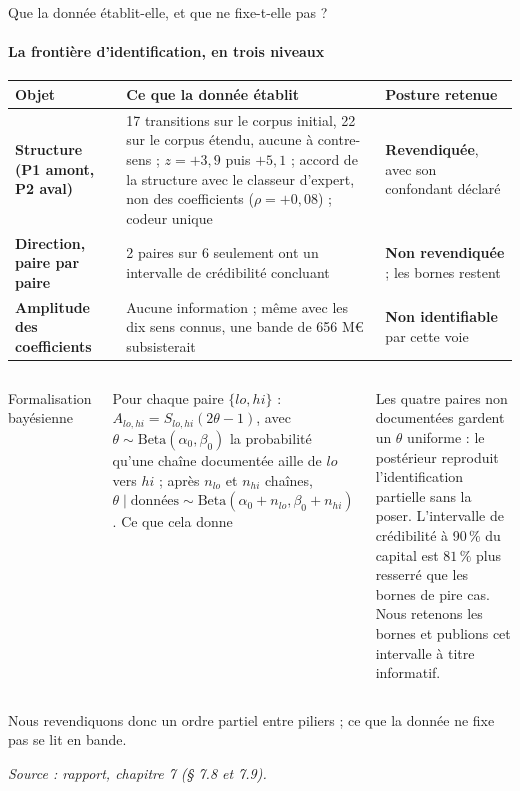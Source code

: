 \documentclass[aspectratio=169,10pt,t]{beamer}
\newcommand{\source}[1]{\par\vfill{\tiny\color{gris}\textit{Source : #1}}\par\vspace{-1mm}}
\renewcommand{\arraystretch}{1.25}
\begin{document}
\begin{frame}{Que la donnée établit-elle, et que ne fixe-t-elle pas ?}
  \suivimethode{}{}
  \framesubtitle{\ajout La frontière d'identification, en trois niveaux}
  \scriptsize
  \renewcommand{\arraystretch}{1.18}
  \begin{tabularx}{\linewidth}{@{}>{\bfseries}l Y Y@{}}
    \toprule
    Objet & Ce que la donnée établit & Posture retenue \\
    \midrule
    Structure (P1 amont, P2 aval) & 17 transitions sur le corpus initial, 22 sur le corpus étendu, aucune à contre-sens ; $z=+3{,}9$ puis $+5{,}1$ ; accord de la structure avec le classeur d'expert, non des coefficients ($\rho=+0{,}08$) ; codeur unique & \textbf{Revendiquée}, avec son confondant déclaré \\
    Direction, paire par paire & 2 paires sur 6 seulement ont un intervalle de crédibilité concluant & \textbf{Non revendiquée} ; les bornes restent \\
    Amplitude des coefficients & Aucune information ; même avec les dix sens connus, une bande de 656 M€ subsisterait & \textbf{Non identifiable} par cette voie \\
    \bottomrule
  \end{tabularx}
  \vspace{2mm}
  \begin{columns}[T,onlytextwidth]
    \footnotesize
    {\editorial\normalsize Formalisation bayésienne}\par\vspace{1mm}
    Pour chaque paire $\{lo,hi\}$ : $A_{lo,hi}=S_{lo,hi}(2\theta-1)$, avec $\theta\sim\mathrm{Beta}(\alpha_0,\beta_0)$ la probabilité qu'une chaîne documentée aille de $lo$ vers $hi$ ; après $n_{lo}$ et $n_{hi}$ chaînes, $\theta\mid\text{données}\sim\mathrm{Beta}(\alpha_0+n_{lo},\beta_0+n_{hi})$.
    \footnotesize
    {\editorial\normalsize Ce que cela donne}\par\vspace{1mm}
    Les quatre paires non documentées gardent un $\theta$ uniforme : le postérieur reproduit l'identification partielle sans la poser. L'intervalle de crédibilité à 90\,\% du capital est $81\,\%$ plus resserré que les bornes de pire cas. Nous retenons les bornes et publions cet intervalle à titre informatif.
  \end{columns}
  \vspace{1.5mm}
  {\color{accent}\footnotesize Nous revendiquons donc un ordre partiel entre piliers ; ce que la donnée ne fixe pas se lit en bande.}
  \source{rapport, chapitre 7 (§ 7.8 et 7.9).}
\end{frame}
\end{document}
